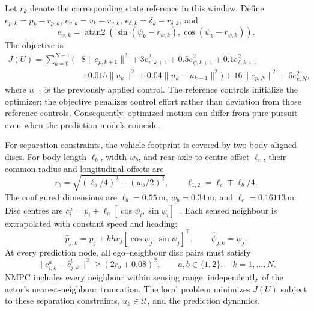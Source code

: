 Let $r_k$ denote the corresponding state reference in this window. Define
$e_{p,k}=p_k-r_{p,k}$, $e_{v,k}=v_k-r_{v,k}$,
$e_{\delta,k}=\delta_k-r_{\delta,k}$, and
\begin{equation}
    e_{\psi,k}=\operatorname{atan2}\!\left(
       \sin(\psi_k-r_{\psi,k}),\cos(\psi_k-r_{\psi,k})\right).
\end{equation}
The objective is
\begin{equation}
\begin{aligned}
    J(U)=\sum_{k=0}^{N-1}\bigl(&
       8\|e_{p,k+1}\|^2+3e_{v,k+1}^2
       +0.5e_{\psi,k+1}^2+0.1e_{\delta,k+1}^2\\
       &+0.015\|u_k\|^2+0.04\|u_k-u_{k-1}\|^2\bigr)
       +16\|e_{p,N}\|^2+6e_{v,N}^2,
\end{aligned}
\end{equation}
where $u_{-1}$ is the previously applied control. The reference controls
initialize the optimizer; the objective penalizes control effort rather than
deviation from those reference controls. Consequently, optimized motion can
differ from pure pursuit even when the prediction models coincide.

For separation constraints, the vehicle footprint is covered by two
body-aligned discs. For body length $\ell_b$, width $w_b$, and rear-axle-to-centre
offset $\ell_c$, their common radius and longitudinal offsets are
\begin{equation}
    r_b=\sqrt{(\ell_b/4)^2+(w_b/2)^2},
    \qquad \ell_{1,2}=\ell_c\mp\ell_b/4.
\end{equation}
The configured dimensions are $\ell_b=0.55\,\mathrm{m}$,
$w_b=0.34\,\mathrm{m}$, and $\ell_c=0.16113\,\mathrm{m}$.
Disc centres are $c_i^a=p_i+\ell_a[\cos\psi_i,\sin\psi_i]^\top$.
Each sensed neighbour is extrapolated with constant speed and heading:
\begin{equation}
    \widehat p_{j,k}=p_j+khv_j[\cos\psi_j,\sin\psi_j]^\top,
    \qquad \widehat\psi_{j,k}=\psi_j.
\end{equation}
At every prediction node, all ego--neighbour disc pairs must satisfy
\begin{equation}
    \|c_{i,k}^{a}-\widehat c_{j,k}^{b}\|^2
       \geq (2r_b+0.08)^2,
    \qquad a,b\in\{1,2\},\quad k=1,\ldots,N.
\end{equation}
NMPC includes every neighbour within sensing range, independently of the
actor's nearest-neighbour truncation. The local problem minimizes $J(U)$
subject to these separation constraints, $u_k\in\mathcal U$, and the
prediction dynamics.

